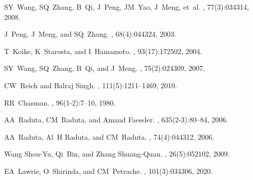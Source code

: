 \documentclass[myclassdoc,debug]{rjparticle}
\begin{document}
\begin{thebibliography}{99}
SY~Wang, SQ~Zhang, B~Qi, J~Peng, JM~Yao, J~Meng, et~al.
, 77(3):034314, 2008.

J~Peng, J~Meng, and SQ~Zhang.
, 68(4):044324, 2003.

T~Koike, K~Starosta, and I~Hamamoto.
, 93(17):172502, 2004.

SY~Wang, SQ~Zhang, B~Qi, and J~Meng.
, 75(2):024309, 2007.

CW~Reich and Balraj Singh.
, 111(5):1211--1469, 2010.

RR~Chasman.
, 96(1-2):7--10, 1980.

AA~Raduta, CM~Raduta, and Amand Faessler.
, 635(2-3):80--84, 2006.

AA~Raduta, Al~H Raduta, and CM~Raduta.
, 74(4):044312, 2006.

Wang Shou-Yu, Qi~Bin, and Zhang Shuang-Quan.
, 26(5):052102, 2009.

EA~Lawrie, O~Shirinda, and CM~Petrache.
, 101(3):034306, 2020.

\end{thebibliography}
\end{document}
